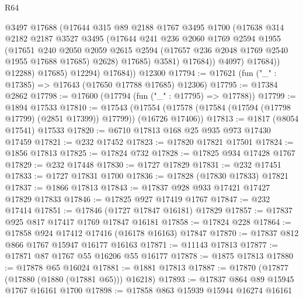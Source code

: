 \begin{lexlean}{R64}
\begin{coremodule}
                      @3497
                      @17688
                      (@17644
                        @315
                        @89
                        @2188
                        @1767
                        @3495
                        @1700
                        (@17638
                          @314
                          @2182
                          @2187
                          @3527
                          @3495
                          (@17644
                            @241
                            @236
                            @2060
                            @1769
                            @2594
                            @1955
                            (@17651
                              @240
                              @2050
                              @2059
                              @2615
                              @2594
                              (@17657 @236 @2048 @1769 @2540 @1955 @17688 @17685)
                              @2628)
                            @17685)
                          @3581)
                        @17684))
                    @4097)
                  @17684))
              @12288)
            @17685)
          @12294)
        @17684))
    @12300
@17794 := @17621 (fun ("_" : @17385) => @17643 (@17650 @17788 @17685) @12306)
@17795 := @17384 @2862
@17798 := @17600 (@17794 (fun ("_" : @17795) => @17788))
@17799 := @1894 @17533
@17810 := @17543
    (@17554 (@17578 (@17584 (@17594 (@17798 @17799) (@2851 @17399)) @17799)) (@16726 @17406))
@17813 := @1817 (@8054 @17541) @17533
@17820 := @6710 @17813 @168 @25 @935 @973 @17430 @17459
@17821 := @232 @17452
@17823 := @17820 @17821 @17501
@17824 := @1856 @17813
@17825 := @17824 @732
@17828 := @17825 @934 @17428 @1767
@17829 := @232 @17448
@17830 := @1727 @17829
@17831 := @232 @17451
@17833 := @1727 @17831 @1700
@17836 := @17828 (@17830 @17833) @17821
@17837 := @1866 @17813
@17843 := @17837 @928 @933 @17421 @17427 @17829 @17833
@17846 := @17825 @927 @17419 @1767
@17847 := @232 @17414
@17851 := @17846 (@1727 @17847 @16181) @17829
@17857 := @17837 @925 @817 @17417 @1769 @17847 @16181
@17858 := @17824 @228
@17864 := @17858 @924 @17412 @17416 (@16178 @16163) @17847
@17870 := @17837 @812 @866 @1767 @15947 @16177 @16163
@17871 := @11143 @17813
@17877 := @17871 @87 @1767 @55 @16206 @55 @16177
@17878 := @1875 @17813
@17880 := @17878 @65 @16024
@17881 := @1881 @17813
@17887 := @17870 (@17877 (@17880 (@1880 (@17881 @65))) @16218)
@17893 := @17837 @864 @89 @15945 @1767 @16161 @1700
@17898 := @17858 @863 @15939 @15944 @16274 @16161

\end{coremodule}
\end{lexlean}
